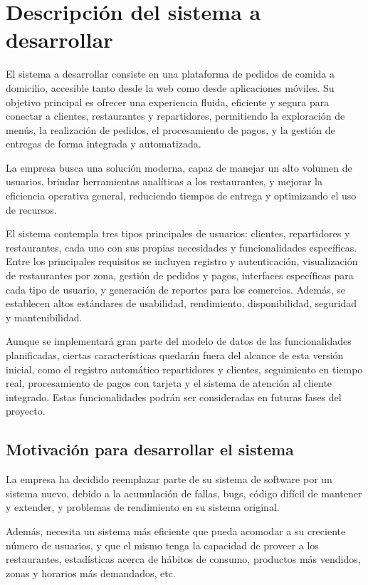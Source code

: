 
\section{Descripción del sistema a desarrollar}
El sistema a desarrollar consiste en una plataforma de pedidos de comida a domicilio, accesible tanto desde la web como desde aplicaciones móviles. Su objetivo principal es ofrecer una experiencia fluida, eficiente y segura para conectar a clientes, restaurantes y repartidores, permitiendo la exploración de menús, la realización de pedidos, el procesamiento de pagos, y la gestión de entregas de forma integrada y automatizada.

La empresa busca una solución moderna, capaz de manejar un alto volumen de usuarios, brindar herramientas analíticas a los restaurantes, y mejorar la eficiencia operativa general, reduciendo tiempos de entrega y optimizando el uso de recursos.

El sistema contempla tres tipos principales de usuarios: clientes, repartidores y restaurantes, cada uno con sus propias necesidades y funcionalidades específicas. Entre los principales requisitos se incluyen registro y autenticación, visualización de restaurantes por zona, gestión de pedidos y pagos, interfaces específicas para cada tipo de usuario, y generación de reportes para los comercios. Además, se establecen altos estándares de usabilidad, rendimiento, disponibilidad, seguridad y mantenibilidad.

Aunque se implementará gran parte del modelo de datos de las funcionalidades planificadas, ciertas características quedarán fuera del alcance de esta versión inicial, como el registro automático repartidores y clientes, seguimiento en tiempo real, procesamiento de pagos con tarjeta y el sistema de atención al cliente integrado. Estas funcionalidades podrán ser consideradas en futuras fases del proyecto.


\subsection{Motivación para desarrollar el sistema}
La empresa ha decidido reemplazar parte de su sistema de software por un sistema nuevo, debido a la acumulación de fallas, bugs, código difícil de mantener y extender, y problemas de rendimiento en su sistema original.

Además, necesita un sistema más eficiente que pueda acomodar a su creciente número de usuarios, y que el mismo tenga la capacidad de proveer a los restaurantes, estadísticas acerca de hábitos de consumo, productos más vendidos, zonas y horarios más demandados, etc.

